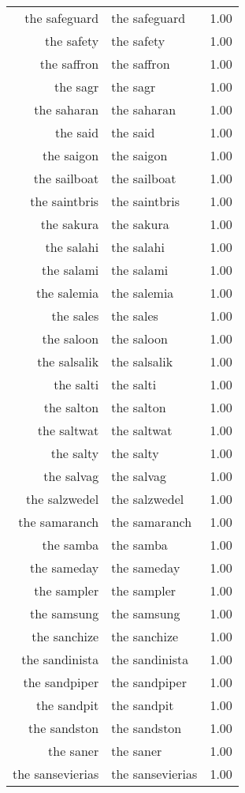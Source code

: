 \begin{table}[ht]
\begin{tabular}{rlr}
  the safeguard & the safeguard & 1.00 \\ 
  the safety & the safety & 1.00 \\ 
  the saffron & the saffron & 1.00 \\ 
  the sagr & the sagr & 1.00 \\ 
  the saharan & the saharan & 1.00 \\ 
  the said & the said & 1.00 \\ 
  the saigon & the saigon & 1.00 \\ 
  the sailboat & the sailboat & 1.00 \\ 
  the saintbris & the saintbris & 1.00 \\ 
  the sakura & the sakura & 1.00 \\ 
  the salahi & the salahi & 1.00 \\ 
  the salami & the salami & 1.00 \\ 
  the salemia & the salemia & 1.00 \\ 
  the sales & the sales & 1.00 \\ 
  the saloon & the saloon & 1.00 \\ 
  the salsalik & the salsalik & 1.00 \\ 
  the salti & the salti & 1.00 \\ 
  the salton & the salton & 1.00 \\ 
  the saltwat & the saltwat & 1.00 \\ 
  the salty & the salty & 1.00 \\ 
  the salvag & the salvag & 1.00 \\ 
  the salzwedel & the salzwedel & 1.00 \\ 
  the samaranch & the samaranch & 1.00 \\ 
  the samba & the samba & 1.00 \\ 
  the sameday & the sameday & 1.00 \\ 
  the sampler & the sampler & 1.00 \\ 
  the samsung & the samsung & 1.00 \\ 
  the sanchize & the sanchize & 1.00 \\ 
  the sandinista & the sandinista & 1.00 \\ 
  the sandpiper & the sandpiper & 1.00 \\ 
  the sandpit & the sandpit & 1.00 \\ 
  the sandston & the sandston & 1.00 \\ 
  the saner & the saner & 1.00 \\ 
  the sansevierias & the sansevierias & 1.00 \\ 

\end{tabular}
\end{table}
